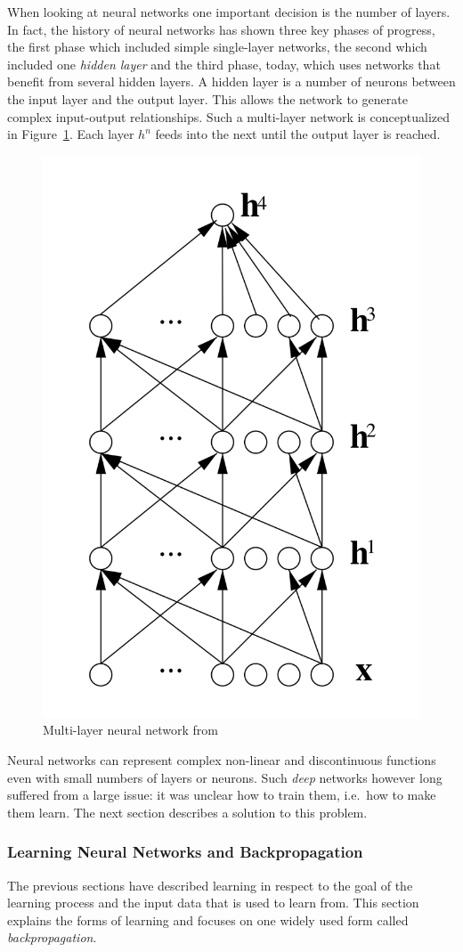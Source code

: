 When looking at neural networks one important decision is the number of layers. In fact, the history of neural networks has shown
three key phases of progress, the first phase which included simple single-layer networks, the second which included one
\emph{hidden layer} and the third phase, today, which uses networks that benefit from several hidden layers. A hidden
layer is a number of neurons between the input layer and the output layer. This allows the network to generate complex
input-output relationships. Such a multi-layer network is conceptualized in Figure~\ref{fig:multilayernn}. Each layer
$h^n$ feeds into the next until the output layer is reached.

\begin{figure}[]
    \centering
    \includegraphics[width=0.3\linewidth]{img/multilayer_nn.png}
    \caption{Multi-layer neural network from \cite[]{bengio2009learning} }
    \label{fig:multilayernn}
\end{figure}

Neural networks can represent complex non-linear and discontinuous functions
\cite[p.732]{russell2016artificial} even with small numbers of layers or neurons. Such \emph{deep} networks however long
suffered from a large issue: it was unclear how to train them, i.e.\ how to make them learn. The next section describes
a solution to this problem.

\subsubsection{Learning Neural Networks and Backpropagation}
\label{sec:Backpropagation}




The previous sections have described learning in respect to the goal of the learning process and the input data that is
used to learn from. This section explains the forms of learning and focuses on one widely used form called \emph{backpropagation}.

